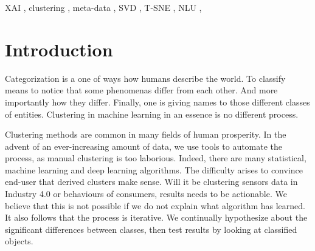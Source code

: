 \documentclass[
 twocolumn,
]{ceurart}
\begin{document}
\begin{keywords}
  XAI \sep
  clustering \sep
  meta-data \sep
  SVD \sep
  T-SNE \sep
  NLU \sep
\end{keywords}

\maketitle

\section{Introduction}
Categorization is a one of ways how humans describe the world.
To classify means to notice that some phenomenas differ from each other.
And more importantly how they differ.
Finally, one is giving names to those different classes of entities.
Clustering in machine learning in an essence is no different process.

Clustering methods are common in many fields of human prosperity.
In the advent of an ever-increasing amount of data, we use tools to automate the process, as manual clustering is too laborious.
Indeed, there are many statistical, machine learning and deep learning algorithms.
The difficulty arises to convince end-user that derived clusters make sense.
Will it be clustering sensors data in Industry 4.0 or behaviours of consumers, results needs to be actionable.
We believe that this is not possible if we do not explain what algorithm has learned. %
It also follows that the process is iterative.
We continually hypothesize about the significant differences between classes, then test results by looking at classified objects.
\end{document}
